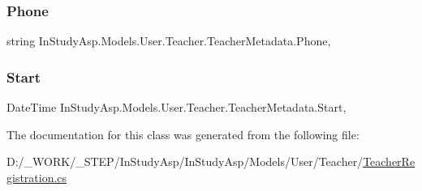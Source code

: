 \subsubsection{\texorpdfstring{Phone}{Phone}}
{\footnotesize\ttfamily string In\+Study\+Asp.\+Models.\+User.\+Teacher.\+Teacher\+Metadata.\+Phone\hspace{0.3cm}{\ttfamily [get]}, {\ttfamily [set]}}

\mbox{\label{class_in_study_asp_1_1_models_1_1_user_1_1_teacher_1_1_teacher_metadata_a43720ff8d11f8c1674777a25b9fd868c}} 
\subsubsection{\texorpdfstring{Start}{Start}}
{\footnotesize\ttfamily Date\+Time In\+Study\+Asp.\+Models.\+User.\+Teacher.\+Teacher\+Metadata.\+Start\hspace{0.3cm}{\ttfamily [get]}, {\ttfamily [set]}}



The documentation for this class was generated from the following file\+:\begin{DoxyCompactItemize}
\item 
D\+:/\+\_\+\+W\+O\+R\+K/\+\_\+\+S\+T\+E\+P/\+In\+Study\+Asp/\+In\+Study\+Asp/\+Models/\+User/\+Teacher/\hyperlink{_teacher_registration_8cs}{Teacher\+Registration.\+cs}\end{DoxyCompactItemize}
